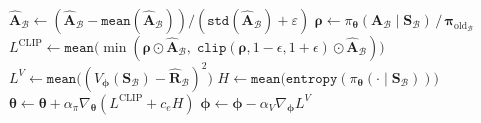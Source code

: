 \documentclass[11pt]{article}
\begin{document}
\begin{algorithm}[p]
\begin{minipage}[t]{0.68\linewidth}
\begin{algorithmic}[1]
            \State $\hat{\mathbf{A}}_\mathcal{B} \gets (\hat{\mathbf{A}}_\mathcal{B} - \texttt{mean}(\hat{\mathbf{A}}_\mathcal{B})) / (\texttt{std}(\hat{\mathbf{A}}_\mathcal{B}) + \varepsilon)$
            \State $\boldsymbol{\rho} \gets \pi_{\boldsymbol{\theta}}(\mathbf{A}_\mathcal{B} \mid \mathbf{S}_\mathcal{B}) \,/\, \boldsymbol{\pi}_{\text{old}_\mathcal{B}}$
            \State $L^{\text{CLIP}} \gets \texttt{mean}\!\big(\min(\boldsymbol{\rho} \odot \hat{\mathbf{A}}_\mathcal{B},\; \texttt{clip}(\boldsymbol{\rho}, 1{-}\epsilon, 1{+}\epsilon) \odot \hat{\mathbf{A}}_\mathcal{B})\big)$
            \State $L^{V} \gets \texttt{mean}\!\big((V_{\boldsymbol{\phi}}(\mathbf{S}_\mathcal{B}) - \hat{\mathbf{R}}_\mathcal{B})^2\big)$
            \State $H \gets \texttt{mean}\!\big(\texttt{entropy}(\pi_{\boldsymbol{\theta}}(\cdot \mid \mathbf{S}_\mathcal{B}))\big)$
            \State $\boldsymbol{\theta} \gets \boldsymbol{\theta} + \alpha_\pi \nabla_{\boldsymbol{\theta}} (L^{\text{CLIP}} + c_e H)$
            \State $\boldsymbol{\phi} \gets \boldsymbol{\phi} - \alpha_V \nabla_{\boldsymbol{\phi}} L^{V}$
        \EndFor
    \EndFor
\EndFor
\end{algorithmic}
\end{minipage}
\end{algorithm}
\end{document}
